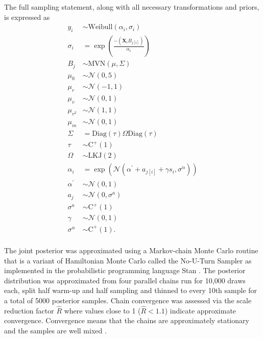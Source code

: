 \documentclass[12pt,letterpaper]{article}
\begin{document}
The full sampling statement, along with all necessary transformations and priors, is expressed as
\begin{equation}
  \begin{aligned}
    y_{i} &\sim \mathrm{Weibull}(\alpha_{i}, \sigma_{i}) \\
    \sigma_{i} &= \exp\left(\frac{-(\mathbf{X}_{i} B_{j[i]})}{\alpha_{i}}\right) \\
    B_{j} &\sim \mathrm{MVN}(\mu, \Sigma) \\
    \mu_{0} &\sim \mathcal{N}(0, 5) \\
    \mu_{r} &\sim \mathcal{N}(-1, 1) \\
    \mu_{v} &\sim \mathcal{N}(0, 1) \\
    \mu_{v^{2}} &\sim \mathcal{N}(1, 1) \\
    \mu_{m} &\sim \mathcal{N}(0, 1) \\
    \Sigma &= \text{Diag}(\tau) \Omega \text{Diag}(\tau) \\
    \tau &\sim \mathrm{C^{+}}(1) \\
    \Omega &\sim \text{LKJ}(2) \\
    \alpha_{i} &= \exp\left(\mathcal{N}(\alpha^{\prime} + a_{j[i]} + \gamma s_{i}, \sigma^{\alpha})\right) \\
    \alpha^{\prime} &\sim \mathcal{N}(0, 1) \\
    a_{j} &\sim \mathcal{N}(0, \sigma^{a}) \\
    \sigma^{a} &\sim \mathrm{C^{+}}(1) \\
    \gamma &\sim \mathcal{N}(0, 1) \\
    \sigma^{\alpha} &\sim \mathrm{C^{+}}(1). \\
  \end{aligned}
  \label{eq:wei_total}
\end{equation}

The  joint posterior was approximated using a Markov-chain Monte Carlo routine that is a variant of Hamiltonian Monte Carlo called the No-U-Turn Sampler \citep{Hoffman2014} as implemented in the probabilistic programming language Stan \citep{2014stan}. The posterior distribution was approximated from four parallel chains run for 10,000 draws each, split half warm-up and half sampling and thinned to every 10th sample for a total of 5000 posterior samples. Chain convergence was assessed via the scale reduction factor \(\hat{R}\) where values close to 1 (\(\hat{R} < 1.1\)) indicate approximate convergence. Convergence means that the chains are approximately stationary and the samples are well mixed \citep{Gelman2013d}.
\end{document}
